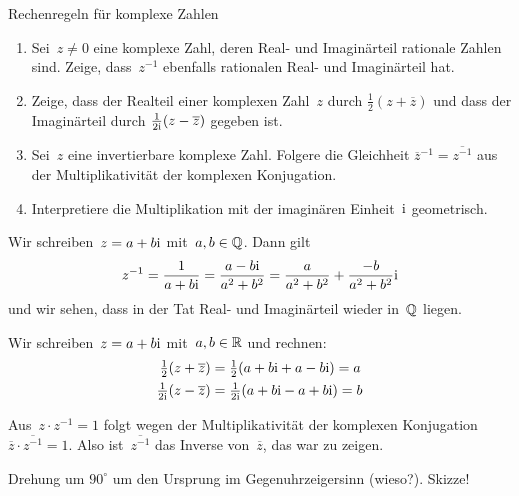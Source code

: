 \documentclass{algblatt}
\begin{document}
\ifloesungen\newpage\fi
\begin{aufgabe}{Rechenregeln für komplexe Zahlen}
\begin{enumerate}
\item
Sei~$z \neq 0$ eine komplexe Zahl, deren Real- und Imaginärteil rationale
Zahlen sind. Zeige, dass~$z^{-1}$ ebenfalls rationalen Real- und Imaginärteil
hat.
\item
Zeige, dass der Realteil einer komplexen Zahl~$z$ durch $\frac{1}{2} (z + \overline z)$
und dass der Imaginärteil durch $\frac{1}{2 \mathrm{i}} (z - \overline z)$ gegeben ist.
\item
Sei~$z$ eine invertierbare komplexe Zahl. Folgere die Gleichheit
$\overline{z}^{-1} = \overline{z^{-1}}$
aus der Multiplikativität der komplexen Konjugation.
\item
Interpretiere die Multiplikation mit der imaginären Einheit~$\mathrm{i}$
geometrisch.
\end{enumerate}
\begin{loesungE}
\item Wir schreiben~$z = a + b \mathrm{i}$ mit~$a,b \in \mathbb{Q}$. Dann gilt
\[ z^{-1} = \frac{1}{a + b \mathrm{i}} = \frac{a - b \mathrm{i}}{a^2 + b^2} =
  \frac{a}{a^2 + b^2} + \frac{-b}{a^2 + b^2} \mathrm{i} \]
und wir sehen, dass in der Tat Real- und Imaginärteil wieder in~$\mathbb{Q}$ liegen.
\item Wir schreiben~$z = a + b \mathrm{i}$ mit~$a,b \in \mathbb{R}$ und rechnen:
\begin{align*}
  \tfrac{1}{2} (z + \overline z) &= \tfrac{1}{2} (a + b \mathrm{i} + a - b \mathrm{i}) = a \\
  \tfrac{1}{2\mathrm{i}} (z - \overline z) &= \tfrac{1}{2\mathrm{i}} (a + b \mathrm{i} - a + b \mathrm{i}) = b
\end{align*}
\item Aus~$z \cdot z^{-1} = 1$ folgt wegen der Multiplikativität der komplexen
Konjugation $\overline z \cdot \overline{z^{-1}} = 1$. Also
ist~$\overline{z^{-1}}$ das Inverse von~$\overline{z}$, das war zu zeigen.
\item Drehung um $90^\circ$ um den Ursprung im Gegenuhrzeigersinn (wieso?). Skizze!
\end{loesungE}
\end{aufgabe}
\end{document}
